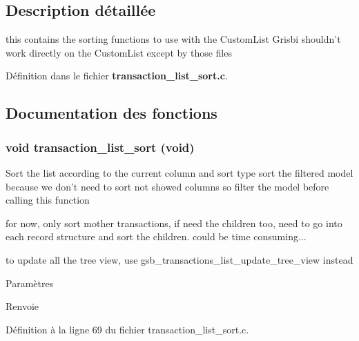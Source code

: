 \subsection{Description détaillée}
this contains the sorting functions to use with the CustomList Grisbi shouldn't work directly on the CustomList except by those files 

Définition dans le fichier {\bf transaction\_\-list\_\-sort.c}.



\subsection{Documentation des fonctions}
\subsubsection[{transaction\_\-list\_\-sort}]{\setlength{\rightskip}{0pt plus 5cm}void transaction\_\-list\_\-sort (void)}\label{transaction__list__sort_8c_a4437cb573f9bba01a794b2e2695e58d4}
Sort the list according to the current column and sort type sort the filtered model because we don't need to sort not showed columns so filter the model before calling this function

for now, only sort mother transactions, if need the children too, need to go into each record structure and sort the children. could be time consuming...

to update all the tree view, use gsb\_\-transactions\_\-list\_\-update\_\-tree\_\-view instead


\begin{DoxyParams}{Paramètres}
\item[{\em }]\end{DoxyParams}
\begin{DoxyReturn}{Renvoie}

\end{DoxyReturn}


Définition à la ligne 69 du fichier transaction\_\-list\_\-sort.c.

